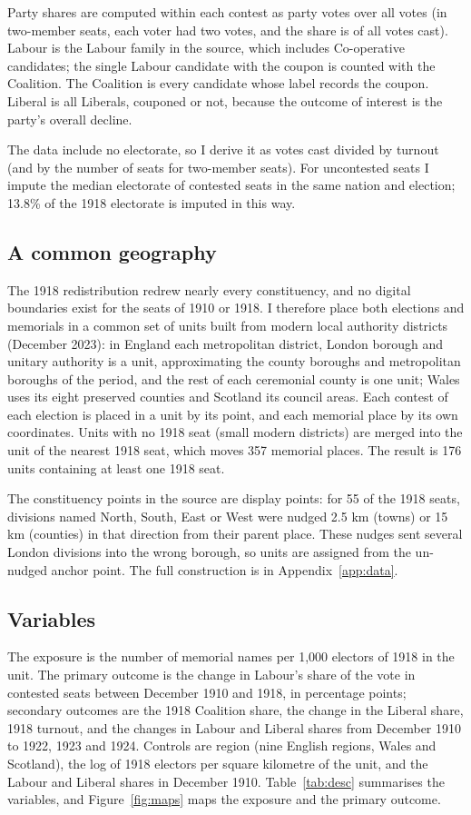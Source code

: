 \documentclass[11pt,a4paper]{article}
\begin{document}
Party shares are computed within each contest as party votes over all votes (in two-member seats, each voter had two votes, and the share is of all votes cast). Labour is the Labour family in the source, which includes Co-operative candidates; the single Labour candidate with the coupon is counted with the Coalition. The Coalition is every candidate whose label records the coupon. Liberal is all Liberals, couponed or not, because the outcome of interest is the party's overall decline.

The data include no electorate, so I derive it as votes cast divided by turnout (and by the number of seats for two-member seats). For uncontested seats I impute the median electorate of contested seats in the same nation and election; 13.8\% of the 1918 electorate is imputed in this way.

\subsection{A common geography}
The 1918 redistribution redrew nearly every constituency, and no digital boundaries exist for the seats of 1910 or 1918. I therefore place both elections and memorials in a common set of units built from modern local authority districts (December 2023): in England each metropolitan district, London borough and unitary authority is a unit, approximating the county boroughs and metropolitan boroughs of the period, and the rest of each ceremonial county is one unit; Wales uses its eight preserved counties and Scotland its council areas. Each contest of each election is placed in a unit by its point, and each memorial place by its own coordinates. Units with no 1918 seat (small modern districts) are merged into the unit of the nearest 1918 seat, which moves 357 memorial places. The result is 176 units containing at least one 1918 seat.

The constituency points in the source are display points: for 55 of the 1918 seats, divisions named North, South, East or West were nudged 2.5 km (towns) or 15 km (counties) in that direction from their parent place. These nudges sent several London divisions into the wrong borough, so units are assigned from the un-nudged anchor point. The full construction is in Appendix~\ref{app:data}.

\subsection{Variables}
The exposure is the number of memorial names per 1,000 electors of 1918 in the unit. The primary outcome is the change in Labour's share of the vote in contested seats between December 1910 and 1918, in percentage points; secondary outcomes are the 1918 Coalition share, the change in the Liberal share, 1918 turnout, and the changes in Labour and Liberal shares from December 1910 to 1922, 1923 and 1924. Controls are region (nine English regions, Wales and Scotland), the log of 1918 electors per square kilometre of the unit, and the Labour and Liberal shares in December 1910. Table~\ref{tab:desc} summarises the variables, and Figure~\ref{fig:maps} maps the exposure and the primary outcome.
\end{document}
